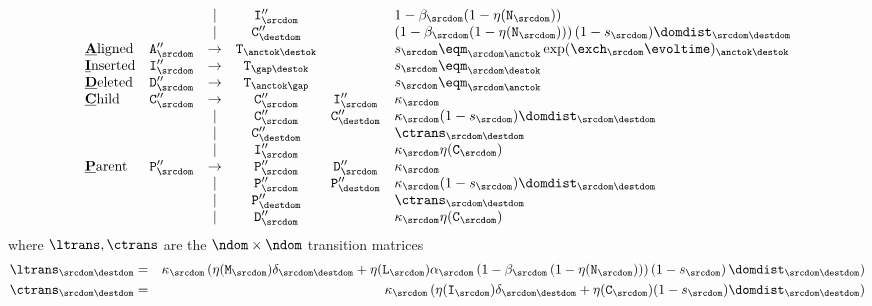 \[\begin{array}{lrcccl}
& & | & \ntins''_\srcdom & & 1 - \beta_\srcdom(1 - \nullability(\ntnew_\srcdom)) \\
& & | & \ntchild''_\destdom & & \left( 1 - \beta_\srcdom(1 - \nullability(\ntnew_\srcdom)) \right) (1 - \tok_\srcdom) \domdist_{\srcdom\destdom} \\
\mbox{\underline{\bf A}ligned} & \ntaln''_\srcdom & \to & \term_{\anctok\destok} & & \tok_\srcdom \eqm_{\srcdom\anctok} \exp(\exch_\srcdom \evoltime)_{\anctok\destok}\\
\mbox{\underline{\bf I}nserted} & \ntins''_\srcdom & \to & \term_{\gap\destok} & & \tok_\srcdom \eqm_{\srcdom\destok} \\
\mbox{\underline{\bf D}eleted} & \ntdel''_\srcdom & \to & \term_{\anctok\gap} & & \tok_\srcdom \eqm_{\srcdom\anctok} \\
\mbox{\underline{\bf C}hild} & \ntchild''_\srcdom & \to & \ntchild''_\srcdom & \ntins''_\srcdom & \kappa_\srcdom \\
& & | & \ntchild''_\srcdom & \ntchild''_\destdom & \kappa_\srcdom (1 - \tok_\srcdom) \domdist_{\srcdom\destdom} \\
& & | & \ntchild''_\destdom & & \ctrans_{\srcdom\destdom} \\
& & | & \ntins''_\srcdom & & \kappa_\srcdom \nullability(\ntchild_\srcdom) \\
\mbox{\underline{\bf P}arent} &
\ntparent''_\srcdom & \to & \ntparent''_\srcdom & \ntdel''_\srcdom & \kappa_\srcdom  \\
& & | & \ntparent''_\srcdom & \ntparent''_\destdom & \kappa_\srcdom (1 - \tok_\srcdom) \domdist_{\srcdom\destdom} \\
& & | & \ntparent''_\destdom & & \ctrans_{\srcdom\destdom} \\
& & | & \ntdel''_\srcdom & & \kappa_\srcdom \nullability(\ntchild_\srcdom) \\
\end{array}
\]
where $\ltrans,\ctrans$ are the $\ndom\times\ndom$ transition matrices
\begin{eqnarray*}
    \ltrans_{\srcdom\destdom} & = & \kappa_\srcdom \left(
    \nullability(\ntmor_\srcdom) \delta_{\srcdom\destdom}  %
+ \nullability(\ntlinks_\srcdom) %
  \alpha_\srcdom %
  \left(1 - \beta_\srcdom\left(1 - \nullability(\ntnew_\srcdom)\right)\right)  %
  \left(1 - \tok_\srcdom\right) \domdist_{\srcdom\destdom} \right)
  \\
    \ctrans_{\srcdom\destdom} & = & \kappa_\srcdom \left(
  \nullability(\ntins_\srcdom) \delta_{\srcdom\destdom}  %
  + \nullability(\ntchild_\srcdom) %
  (1 - \tok_\srcdom) \domdist_{\srcdom\destdom}  %
  \right)
\end{eqnarray*}

